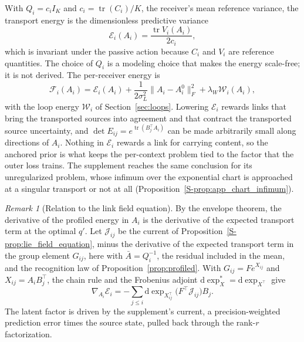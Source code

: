 \documentclass[11pt]{article}
\theoremstyle{definition}
\theoremstyle{remark}
\newtheorem{remark}[theorem]{Remark}
\providecommand{\tr}{\operatorname{tr}}
\newcommand{\dexp}{\mathrm d\exp}
\newcommand{\Sref}[1]{\ref{S-#1}}
\begin{document}
With $Q_i=c_iI_K$ and $c_i=\tr(C_i)/K$, the receiver's mean reference variance, the transport energy is the dimensionless predictive variance
\begin{equation}
\mathcal E_i(A_i)=\frac{\tr V_i(A_i)}{2c_i},
\label{eq:transport_energy}
\end{equation}
which is invariant under the passive action because $C_i$ and $V_i$ are reference quantities. The choice of $Q_i$ is a modeling choice that makes the energy scale-free; it is not derived. The per-receiver energy is
\begin{equation}
\mathcal F_i(A_i)=\mathcal E_i(A_i)+\frac{1}{2\sigma_L^2}\|A_i-A_i^0\|_F^2+\lambda_W\mathcal W_i(A_i),
\label{eq:receiver_energy}
\end{equation}
with the loop energy $\mathcal W_i$ of Section~\ref{sec:loops}. Lowering $\mathcal E_i$ rewards links that bring the transported sources into agreement and that contract the transported source uncertainty, and $\det E_{ij}=e^{\tr(B_j^\top A_i)}$ can be made arbitrarily small along directions of $A_i$. Nothing in $\mathcal E_i$ rewards a link for carrying content, so the anchored prior is what keeps the per-context problem tied to the factor that the outer loss trains. The supplement reaches the same conclusion for its unregularized problem, whose infimum over the exponential chart is approached at a singular transport or not at all (Proposition~\Sref{prop:app_chart_infimum}).

\begin{remark}[Relation to the link field equation]
\label{rem:current}
By the envelope theorem, the derivative of the profiled energy in $A_i$ is the derivative of the expected transport term at the optimal $q'$. Let $\mathcal J_{ij}$ be the current of Proposition~\Sref{prop:lie_field_equation}, minus the derivative of the expected transport term in the group element $G_{ij}$, here with $\bar A=Q_i^{-1}$, the residual included in the mean, and the recognition law of Proposition~\ref{prop:profiled}. With $G_{ij}=Fe^{X_{ij}}$ and $X_{ij}=A_iB_j^\top$, the chain rule and the Frobenius adjoint $\dexp_X^*=\dexp_{X^\top}$ \citep{Higham2008} give
\begin{equation}
\nabla_{A_i}\mathcal E_i=-\sum_{j\le i}\dexp_{X_{ij}^\top}\bigl(F^\top\mathcal J_{ij}\bigr)B_j.
\label{eq:pulled_current}
\end{equation}
The latent factor is driven by the supplement's current, a precision-weighted prediction error times the source state, pulled back through the rank-$r$ factorization.
\end{remark}
\end{document}
